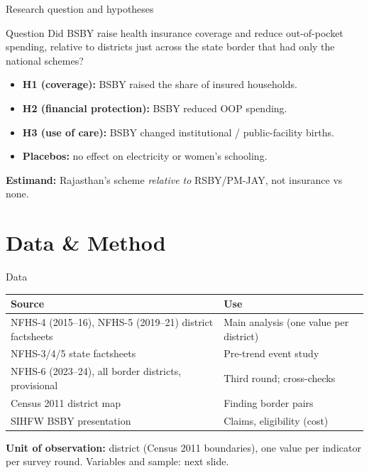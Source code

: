 \documentclass[compress]{beamer}
\newcommand{\hl}[1]{\textcolor{IITRRed}{\textbf{#1}}}
\begin{document}
\begin{frame}[t]{Research question and hypotheses}
\begin{block}{Question}
Did BSBY raise health insurance coverage and reduce out-of-pocket spending, relative to districts just across the state border that had only the national schemes?
\end{block}
\small
\begin{itemize}
\item \textbf{H1 (coverage):} BSBY raised the share of insured households.
\item \textbf{H2 (financial protection):} BSBY reduced OOP spending.
\item \textbf{H3 (use of care):} BSBY changed institutional / public-facility births.
\item \textbf{Placebos:} no effect on electricity or women's schooling.
\end{itemize}
\vspace{4pt}
\hl{Estimand:} Rajasthan's scheme \emph{relative to} RSBY/PM-JAY, not insurance vs none.
\end{frame}

\section{Data \& Method}

\begin{frame}[t]{Data}
\footnotesize
\begin{tabular}{@{}p{4.2cm}p{5.6cm}@{}}
\toprule
\textbf{Source} & \textbf{Use} \\
\midrule
NFHS-4 (2015--16), NFHS-5 (2019--21) district factsheets & Main analysis (one value per district) \\
NFHS-3/4/5 state factsheets & Pre-trend event study \\
NFHS-6 (2023--24), all border districts, provisional & Third round; cross-checks \\
Census 2011 district map & Finding border pairs \\
SIHFW BSBY presentation & Claims, eligibility (cost) \\
\bottomrule
\end{tabular}
\vspace{6pt}

\textbf{Unit of observation:} district (Census 2011 boundaries), one value per indicator per survey round. Variables and sample: next slide.
\end{frame}
\end{document}
